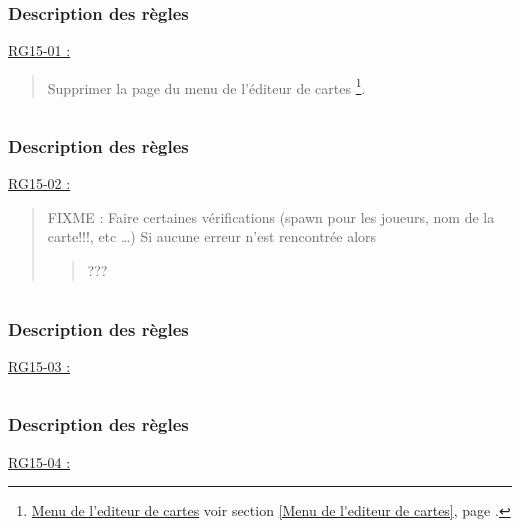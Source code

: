 \documentclass{report}
\begin{document}
		\subsubsection{Description des règles}

			\underline{RG15-01 :}
				\begin{quote}
				Supprimer la page du menu de l'éditeur de cartes
				\footnote[1]{
						\hyperlink{Menu de l'editeur de cartes}{Menu de l'editeur de cartes}
						\og voir section \ref{Menu de l'editeur de cartes}, page \pageref{Menu de l'editeur de cartes}.\fg
				}.
				\end{quote}
				
			$\,$
			
		\subsubsection{Description des règles}

			\underline{RG15-02 :}
				\begin{quote}
					FIXME : Faire certaines vérifications (spawn pour les joueurs, nom de la carte!!!,  etc \ldots)
					Si aucune erreur n'est rencontrée alors
					\begin{quote}	
						???
					\end{quote}
				\end{quote}
				
			$\,$
			
		\subsubsection{Description des règles}

			\underline{RG15-03 :}
				\begin{quote}

				\end{quote}
				
			$\,$
			
		\subsubsection{Description des règles}

			\underline{RG15-04 :}
				\begin{quote}

				\end{quote}
		
				
\end{document}
